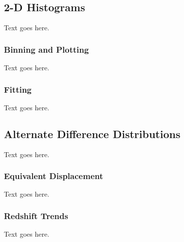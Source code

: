 \subsection{2-D Histograms}
\label{subsec:analysis--2d_histograms}


Text goes here.



\subsubsection{Binning and Plotting}
\label{subsubsec:analysis--2d_histograms--binning_plotting}


Text goes here.



\subsubsection{Fitting}
\label{subsubsec:analysis--2d_histograms--fitting}


Text goes here.




\subsection{Alternate Difference Distributions}
\label{subsec:analysis--alt_diff_dist}


Text goes here.



\subsubsection{Equivalent Displacement}
\label{subsubsec:analysis--alt_diff_dist--equiv_displacment}


Text goes here.



\subsubsection{Redshift Trends}
\label{subsubsec:analysis--alt_diff_dist--trends}


Text goes here.




